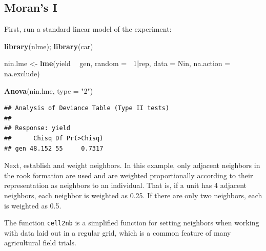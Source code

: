 \documentclass[]{book}
\newenvironment{Shaded}{\begin{snugshade}}{\end{snugshade}}
\newcommand{\CommentTok}[1]{\textcolor[rgb]{0.56,0.35,0.01}{\textit{#1}}}
\newcommand{\DataTypeTok}[1]{\textcolor[rgb]{0.13,0.29,0.53}{#1}}
\newcommand{\DecValTok}[1]{\textcolor[rgb]{0.00,0.00,0.81}{#1}}
\newcommand{\KeywordTok}[1]{\textcolor[rgb]{0.13,0.29,0.53}{\textbf{#1}}}
\newcommand{\NormalTok}[1]{#1}
\newcommand{\OperatorTok}[1]{\textcolor[rgb]{0.81,0.36,0.00}{\textbf{#1}}}
\newcommand{\StringTok}[1]{\textcolor[rgb]{0.31,0.60,0.02}{#1}}
\begin{document}
\hypertarget{morans-i-1}{%
\subsection{Moran's I}\label{morans-i-1}}

First, run a standard linear model of the experiment:

\begin{Shaded}
\begin{Highlighting}[]
\KeywordTok{library}\NormalTok{(nlme); }\KeywordTok{library}\NormalTok{(car)}

\NormalTok{nin.lme <-}\StringTok{ }\KeywordTok{lme}\NormalTok{(yield }\OperatorTok{~}\StringTok{ }\NormalTok{gen, }\DataTypeTok{random =} \OperatorTok{~}\DecValTok{1}\OperatorTok{|}\NormalTok{rep,}
              \DataTypeTok{data =}\NormalTok{ Nin,}
              \DataTypeTok{na.action =}\NormalTok{ na.exclude)}

\KeywordTok{Anova}\NormalTok{(nin.lme, }\DataTypeTok{type =} \StringTok{"2"}\NormalTok{)}
\end{Highlighting}
\end{Shaded}

\begin{verbatim}
## Analysis of Deviance Table (Type II tests)
## 
## Response: yield
##      Chisq Df Pr(>Chisq)
## gen 48.152 55     0.7317
\end{verbatim}

Next, establish and weight neighbors. In this example, only adjacent neighbors in the rook formation are used and are weighted proportionally according to their representation as neighbors to an individual. That is, if a unit has 4 adjacent neighbors, each neighbor is weighted as 0.25. If there are only two neighbors, each is weighted as 0.5.

The function \texttt{cell2nb} is a simplified function for setting neighbors when working with data laid out in a regular grid, which is a common feature of many agricultural field trials.

\begin{Shaded}
\end{Shaded}
\end{document}
